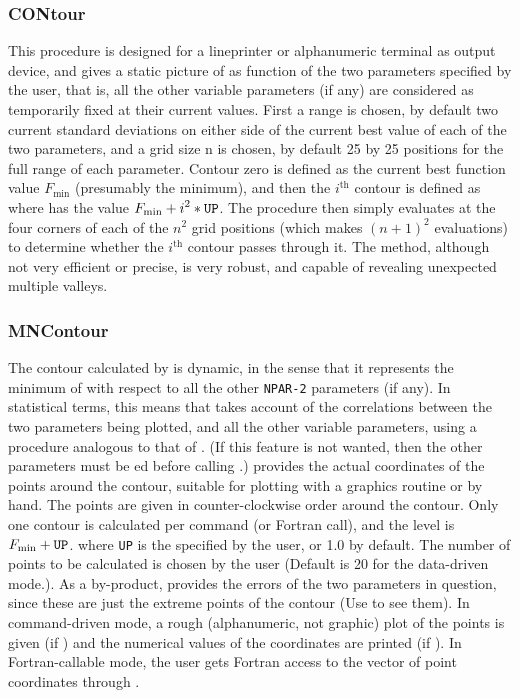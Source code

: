\subsubsection{CONtour}

This procedure is designed for a lineprinter or alphanumeric
terminal as output device, and gives a static picture of 
as function of the two parameters specified by the user, that is,
all the other variable parameters (if any) are considered as
temporarily fixed at their current values.  First a range is
chosen, by default two current standard deviations on either
side of the current best value of each of the two parameters,
and a grid size n is chosen, by default 25 by 25 positions
for the full range of each parameter.  Contour zero is defined
as the current best function value $\displaystyle F_{\mathrm{min}}$
(presumably the minimum), and then the $\displaystyle i^{\mathrm{th}}$
contour is defined as where  has the value
$\displaystyle F_{\mathrm{min}} + i^2 * \mbox{\tt UP}$.
The procedure then simply evaluates  at the four corners of
each of the $n^2$ grid positions (which makes $(n+1)^2$ evaluations)
to determine whether the $\displaystyle i^{\mathrm{th}}$ contour passes through
it. The method, although not very efficient or precise,
is very robust, and capable of revealing unexpected
multiple valleys.
 
\subsubsection{MNContour}

The contour calculated by  is dynamic, in the sense
that it represents the minimum of  with respect to all the
other \texttt{NPAR-2} parameters (if any). In statistical terms, this
means that  takes account of the correlations between
the two parameters being plotted, and all the other variable
parameters, using a procedure analogous to that of .
(If this feature is not wanted, then the other
parameters must be ed before calling .)
 provides the actual coordinates of the points around
the contour, suitable for plotting with a graphics routine or
by hand. The points are given in counter-clockwise order
around the contour.
Only one contour is calculated per command (or Fortran call),
and the level is $\displaystyle F_{\mathrm{min}} + \mbox{\tt UP}$.
where \texttt{UP} is the
 specified by the user, or 1.0 by default.
The number of points to be calculated is chosen by
the user (Default is 20 for the data-driven mode.).
As a by-product,  provides the  errors of the
two parameters in question, since these are just the extreme
points of the contour (Use  to see them).
In command-driven mode, a rough (alphanumeric, not graphic)
plot of the points is given 
(if ) 
and the numerical values of the coordinates are printed 
(if ).
In Fortran-callable mode, the user gets Fortran
access to the vector of point coordinates through
.
